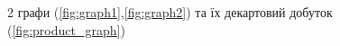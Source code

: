 \begin{figure}[h]
  \centering
  \subfloat[Граф 1]{\label{fig:graph1}
    
  }
  \subfloat[Граф 2]{\label{fig:graph2}
    
  }
  \subfloat[Граф 3]{\label{fig:product_graph}
    
  }
  \caption{2 графи (\ref{fig:graph1},\ref{fig:graph2}) та їх декартовий добуток (\ref{fig:product_graph})}
  \label{fig:graphs}
\end{figure}
